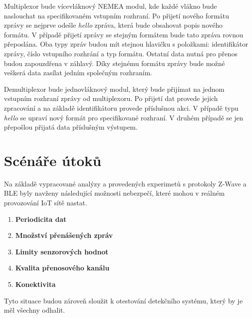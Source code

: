  Multiplexor bude vícevláknový NEMEA modul, kde každé vlákno bude naslouchat na specifikovaném
 vstupním rozhraní. Po přijetí nového formátu zprávy se nejprve odešle \textit{hello} zpráva, která
 bude obsahovat popis nového formátu. V případě přijetí zprávy se stejným formátem bude tato 
 zpráva rovnou přeposlána. Oba typy zpráv budou mít stejnou hlavičku s položkami: 
 identifikátor zprávy, 
 číslo vstupního rozhrání a typ formátu. Ostatní data nutná pro přenos budou zapouzdřena v 
 záhlavý. Díky stejnému formátu zprávy bude možné veškerá data zasílat jedním společným rozhraním.
 
 Demultiplexor bude jednovláknový modul, který bude přijímat na jednom vstupním rozhraní zprávy
 od multiplexoru. Po přijetí dat provede jejich zpracování a na základě identifikátoru 
 provede příslušnou akci. V případě typu \textit{hello} se upraví nový formát pro specifikované 
 rozhraní. V druhém případě se jen přepošlou přijatá data příslušným výstupem.
 
 \section{Scénáře útoků}
 Na základě vypracované analýzy a provedených experimetů s protokoly Z-Wave a BLE byly navženy
 následující možnosti nebezpečí, které mohou v reálném provozování IoT sítě nastat. 
 
   \begin{enumerate}
    \item \textbf{Periodicita dat}
    \item \textbf{Množství přenášených zpráv}
    \item \textbf{Limity senzorových hodnot}
    \item \textbf{Kvalita přenosového kanálu}
    \item \textbf{Konektivita}
   \end{enumerate}

  Tyto situace budou zároveň sloužit k otestování detekčního systému, který by je měl všechny 
  odhalit.